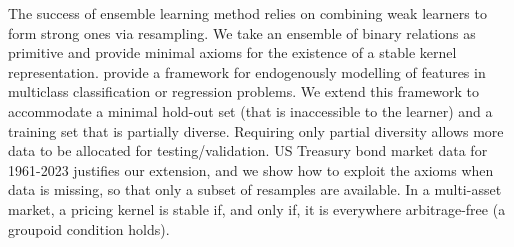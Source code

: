 %
%
\begin{countabstract}
  The success of ensemble learning method relies on combining weak learners to form strong ones via resampling.
  We take an ensemble of binary relations as primitive and provide minimal axioms for the existence of a stable kernel representation.
  \citet{gilboa2003inductive} provide a framework for endogenously modelling of features in multiclass classification or regression problems.
  We extend this framework to accommodate a minimal hold-out set (that is inaccessible to the learner) and a training set that is partially diverse.
  Requiring only partial diversity allows more data to be allocated for testing/validation.
  US Treasury bond market data for 1961-2023 justifies our extension, and we show how to exploit the axioms when data is missing, so that only a subset of resamples are available.
  In a multi-asset market, a pricing kernel is stable if, and only if, it is everywhere arbitrage-free (a groupoid condition holds).
\end{countabstract}


